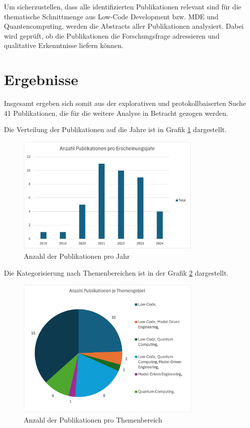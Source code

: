 Um sicherzustellen, dass alle identifizierten Publikationen relevant sind für die thematische Schnittmenge aus Low-Code Development bzw. 
MDE und Quantencomputing, werden die Abstracts aller Publikationen analysiert. Dabei wird geprüft, ob die Publikationen die 
Forschungsfrage adressieren und qualitative Erkenntnisse liefern können. 

\section{Ergebnisse}
Insgesamt ergeben sich somit aus der explorativen und protokollbaiserten Suche 41 Publikationen, die für die weitere Analyse 
in Betracht gezogen werden. 

Die Verteilung der Publikationen auf die Jahre ist in Grafik \ref{fig:publications_per_year} dargestellt.

\begin{figure}[h!]
    \centering
    \includegraphics[width=0.8\textwidth]{graphics/anzahl_pubs_jahr.png}
    \caption{Anzahl der Publikationen pro Jahr}
    \label{fig:publications_per_year}
\end{figure}

Die Kategorisierung nach Themenbereichen ist in der Grafik \ref{fig:publications_per_topic} dargestellt.

\begin{figure}[h!]
    \centering
    \includegraphics[width=0.8\textwidth]{graphics/anzahl_themen_pubs.png}
    \caption{Anzahl der Publikationen pro Themenbereich}
    \label{fig:publications_per_topic}
\end{figure}

